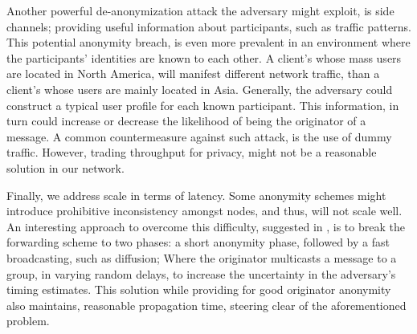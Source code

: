 Another powerful de-anonymization attack the adversary might exploit, is side channels; providing useful information about participants, such as traffic patterns. This potential anonymity breach, is even more prevalent in 
an environment where the participants’ identities are known to each other. 
A client’s whose mass users are located in North America, will manifest different  network traffic, than a client’s whose users are mainly located in Asia. Generally, the adversary could construct a typical user profile for each known participant. This information, in turn could increase or decrease the likelihood of being the originator of a message.
A common countermeasure against such attack, is the use of dummy traffic. However, trading throughput for privacy, might not be a reasonable solution in our network.

Finally, we address scale in terms of latency. Some anonymity schemes might introduce prohibitive inconsistency amongst nodes, and thus, will not scale well. An interesting approach to overcome this difficulty, suggested in \cite{Dandelion}, is to break the forwarding scheme to two phases: a short anonymity phase, followed by a fast broadcasting, such as diffusion; Where the originator multicasts a message to a group, in varying random delays, to increase the uncertainty in the adversary’s timing estimates. 
This solution while providing for good originator anonymity also maintains, reasonable propagation time, steering clear of the aforementioned problem. 









